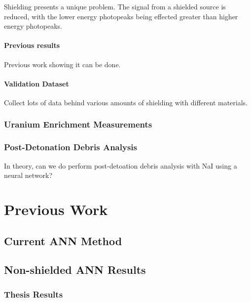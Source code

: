 \documentclass[thesis,tocnosub,noragright,centerchapter,12pt,fullpage]{uiucecethesis09}
\begin{document}
Shielding presents a unique problem. The signal from a shielded source is reduced, with the lower energy photopeaks being effected greater than higher energy photopeaks. 

\subsubsection{Previous results}

Previous work showing it can be done.

\subsubsection{Validation Dataset}

Collect lots of data behind various amounts of shielding with different materials. 


\subsection{Uranium Enrichment Measurements}




















\subsection{Post-Detonation Debris Analysis}

In theory, can we do perform post-detoation debris analysis with NaI using a neural network?  


\chapter{Previous Work}

\section{Current ANN Method}


\section{Non-shielded ANN Results}

\subsection{Thesis Results}
\end{document}
